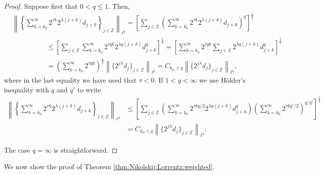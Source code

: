 \documentclass[10pt,a4paper]{article}
\theoremstyle{remark}
\newcommand{\ent}{\mathbb{Z}}
\newcommand{\norm}[2]{\left\|#1\right\|_{#2}}
\begin{document}
\begin{proof}
Suppose first that $0 < q \leq 1$. Then,
\begin{align*}
& \norm{\left\{\sum_{k=k_0}^\infty 2^{\tau k} 2^{\lambda(j+k)}d_{j+k}\right\}_{j\in \ent}}{\ell^q} = \left[\sum_{j \in \ent} \left( \sum_{k=k_0}^\infty 2^{\tau k} 2^{\lambda(j+k)}d_{j+k} \right)^q \right]^\frac{1}{q}\\
& \quad\quad\quad\quad\quad \leq  \left[\sum_{j \in \ent}  \sum_{k=k_0}^\infty 2^{\tau q k} 2^{\lambda q (j+k)}d_{j+k}^q \right]^\frac{1}{q} =  \left[ \sum_{k=k_0}^\infty  2^{\tau q k} \sum_{j \in \ent} 2^{\lambda q (j+k)}d_{j+k}^q \right]^\frac{1}{q}\\
&  \quad\quad\quad \quad \quad = \left(  \sum_{k=k_0}^\infty   2^{\tau q k}     \right)^\frac{1}{q} \norm{\{2^{j \lambda} d_j\}_{j\in \ent}}{\ell^q} = C_{k_0, \tau, q} \norm{\{2^{j \lambda} d_j\}_{j\in\ent}}{\ell^q},
\end{align*}
where in the last equality we have used that $\tau < 0$. If $1 < q < \infty$ we use H\"older's inequality with $q$ and $q'$ to write
\begin{align*}
 \norm{\left\{\sum_{k=k_0}^\infty 2^{\tau k} 2^{\lambda(j+k)}d_{j+k}\right\}_{j\in\ent}}{\ell^q} 
& \le \left[\sum_{j \in \ent}   \left(\sum_{k=k_0}^\infty 2^{\tau k q/2} 2^{\lambda q(j+k)}d_{j+k}^q \right)     \left( \sum_{k=k_0}^\infty 2^{\tau kq'/2} \right)^{q/q'}   \right]^\frac{1}{q}\\
&    =C_{k_0, \tau, q} \norm{\{2^{j \lambda} d_j\}_{j\in\ent}}{\ell^q}.
\end{align*}

The case $q = \infty$ is straightforward.
\end{proof}

We now show the proof of Theorem \ref{thm:Nikolskij:Lorrentz:weighted}.
\end{document}

